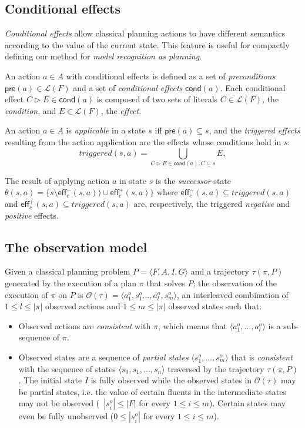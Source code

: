 \documentclass[letterpaper]{article} %
\newcommand{\tup}[1]{{\langle #1 \rangle}}
\newcommand{\pre}{\mathsf{pre}}     %
\newcommand{\eff}{\mathsf{eff}}     %
\newcommand{\cond}{\mathsf{cond}}   %
\begin{document}
\subsection{Conditional effects}
{\em Conditional effects} allow classical planning actions to have different semantics according to the value of the current state. This feature is useful for compactly defining our method for {\em model recognition as planning}. 

An action $a\in A$ with conditional effects is defined as a set of {\em preconditions} $\pre(a)\in\mathcal{L}(F)$ and a set of {\em conditional effects} $\cond(a)$. Each conditional effect $C\rhd E\in\cond(a)$ is composed of two sets of literals $C\in\mathcal{L}(F)$, the {\em condition}, and $E\in\mathcal{L}(F)$, the {\em effect}.

An action $a\in A$ is {\em applicable} in a state $s$ iff $\pre(a)\subseteq s$, and the {\em triggered effects} resulting from the action application are the effects whose conditions hold in $s$:
\[
triggered(s,a)=\bigcup_{C\rhd E\in\cond(a),C\subseteq s} E,
\]

The result of applying action $a$ in state $s$ is the {\em successor} state $\theta(s,a)=\{s\setminus\eff_c^-(s,a))\cup\eff_c^+(s,a)\}$ where $\eff_c^-(s,a)\subseteq triggered(s,a)$ and $\eff_c^+(s,a)\subseteq triggered(s,a)$ are, respectively, the triggered {\em negative} and {\em positive} effects.

\subsection{The observation model}
Given a classical planning problem $P=\tup{F,A,I,G}$ and a trajectory $\tau(\pi,P)$ generated by the execution of a plan $\pi$ that solves $P$; the observation of the execution of $\pi$ on $P$ is $\mathcal{O}(\tau)=\tup{a_1^o,s_1^o \ldots , a_l^o, s_m^o}$, an interleaved combination of {\small $1\leq l\leq |\pi|$} observed actions and {\small $1\leq m\leq |\pi|$} observed states such that:
\begin{itemize}
\item Observed actions are {\em consistent} with $\pi$, which means that $\tup{a_1^o, \ldots, a_l^o}$ is a sub-sequence of $\pi$. 
\item Observed states are a sequence of {\em partial states} $\tup{s_1^o, \ldots, s_m^o}$ that is {\em consistent} with the sequence of states $\tup{s_0, s_1, \ldots, s_n}$ traversed by the trajectory $\tau(\pi,P)$. The initial state $I$ is fully observed while the observed states in $\mathcal{O}(\tau)$ may be partial states, i.e. the value of certain fluents in the intermediate states may not be observed (~$|s_i^o|\leq |F|$ for every $1\leq i\leq m$). Certain states may even be fully unobserved ($0\leq|s_i^o|$ for every $1\leq i\leq m$).  
\end{itemize}
\end{document}
